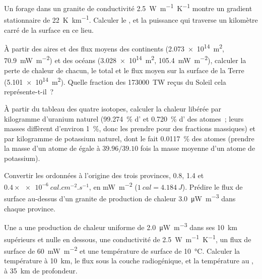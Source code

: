 \begin{exercise}[$\star$]\label{exo:b1:heat-budget:1}
Un forage dans un granite de conductivité \qty{2.5}{W.m^{-1}.K^{-1}} montre un
gradient stationnaire de \qty{22}{K.km^{-1}}. Calculer le , et la
puissance qui traverse un kilomètre carré de la surface en ce lieu.
\end{exercise}

\begin{exercise}[$\star$]\label{exo:b1:heat-budget:2}
À partir des aires et des flux moyens des continents (\qty{2.073e14}{m^2},
\qty{70.9}{mW.m^{-2}}) et des océans (\qty{3.028e14}{m^2},
\qty{105.4}{mW.m^{-2}}), calculer la perte de chaleur de chacun, le total et le
flux moyen sur la surface de la Terre (\qty{5.101e14}{m^2}). Quelle fraction des
\qty{173000}{TW} reçus du Soleil cela représente-t-il~?
\end{exercise}

\begin{exercise}[$\star$]\label{exo:b1:heat-budget:3}
À partir du tableau des quatre isotopes, calculer la chaleur libérée par kilogramme
d'uranium naturel (\qty{99.274}{\percent} d' et \qty{0.720}{\percent}
d' des atomes~; leurs masses diffèrent d'environ \qty{1}{\percent}, donc
les prendre pour des fractions massiques) et par kilogramme de potassium naturel,
dont le  fait \qty{0.0117}{\percent} des atomes (prendre la masse d'un
atome de  égale à $39.96/39.10$ fois la masse moyenne d'un atome de potassium).
\end{exercise}

\begin{exercise}[$\star$]\label{exo:b1:heat-budget:4}
Convertir les ordonnées à l'origine des trois provinces, 0.8, 1.4 et
$0.4\times\qty{e-6}{cal.cm^{-2}.s^{-1}}$, en \unit{mW.m^{-2}}
($\qty{1}{cal} = \qty{4.184}{J}$). Prédire le flux de surface au-dessus d'un granite
de production de chaleur \qty{3.0}{\micro W.m^{-3}} dans chaque province.
\end{exercise}

\begin{exercise}[$\star\star$]\label{exo:b1:heat-budget:5}
Une  a une production de chaleur uniforme de \qty{2.0}{\micro W.m^{-3}} dans
ses \qty{10}{km} supérieurs et nulle en dessous, une conductivité de
\qty{2.5}{W.m^{-1}.K^{-1}}, un flux de surface de \qty{60}{mW.m^{-2}} et une
température de surface de \qty{10}{\degreeCelsius}. Calculer la température à
\qty{10}{km}, le flux sous la couche radiogénique, et la température au , à
\qty{35}{km} de profondeur.
\end{exercise}

